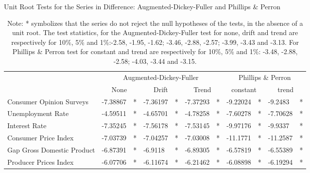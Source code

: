 
\begin{table}[!h]
\caption{Unit Root Tests for the Series in Difference: Augmented-Dickey-Fuller and Phillips \& Perron}
\begin{adjustbox}{max width=\textwidth}
\begin{tabular}{lllllllllll}
\hline
                           & \multicolumn{6}{c|}{Augmented-Dickey-Fuller}                                        & \multicolumn{4}{c}{Phillips \& Perron}                    \\
                           & \multicolumn{2}{c|}{None} & \multicolumn{2}{c|}{Drift} & \multicolumn{2}{c|}{Trend} & \multicolumn{2}{c|}{constant} & \multicolumn{2}{c}{trend} \\ \hline
Consumer Opinion Surveys   & -7.38867        & *       & -7.36197        & *        & -7.37293        & *        & -9.22024          & *         & -9.2483         & *       \\
Unemployment Rate          & -4.59511        & *       & -4.65701        & *        & -4.78258        & *        & -7.60278          & *         & -7.70628        & *       \\
Interest Rate              & -7.35245        & *       & -7.56178        & *        & -7.53145        & *        & -9.97176          & *         & -9.9337         & *       \\
Consumer Price Index       & -7.03739        & *       & -7.04257        & *        & -7.03008        & *        & -11.1771          & *         & -11.2587        & *       \\
Gap Gross Domestic Product & -6.87391        & *       & -6.9118         & *        & -6.89305        & *        & -6.57819          & *         & -6.55389        & *       \\
Producer Prices Index      & -6.07706        & *       & -6.11674        & *        & -6.21462        & *        & -6.08898          & *         & -6.19294        & *       \\ \hline
\end{tabular}
\end{adjustbox}
\caption*{Note: * symbolizes that the series do not reject the null hypotheses of the tests, in the absence of a unit root. The test statistics, for the Augmented-Dickey-Fuller test for none, drift and trend are respectively for 10\%, 5\% and 1\%:-2.58, -1.95, -1.62; -3.46, -2.88, -2.57; -3.99, -3.43 and -3.13. For Phillips \& Perron test for constant and trend are respectively for 10\%, 5\% and 1\%: -3.48, -2.88, -2.58; -4.03, -3.44 and -3.15.}
\end{table}





